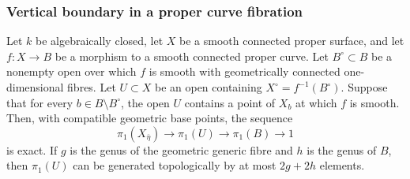 \subsubsection{Vertical boundary in a proper curve fibration}

\begin{proposition}
\label{D:vertical-fibration-exact}
Let $k$ be algebraically closed, let $X$ be a smooth connected
proper surface, and let $f:X\to B$ be a morphism to a smooth
connected proper curve.  Let $B^\circ\subset B$ be a nonempty
open over which $f$ is smooth with geometrically connected
one-dimensional fibres.  Let $U\subset X$ be an open containing
$X^\circ=f^{-1}(B^\circ)$.  Suppose that for every
$b\in B\setminus B^\circ$, the open $U$ contains a point of
$X_b$ at which $f$ is smooth.  Then, with compatible geometric
base points, the sequence
\[
 \pi_1(X_{\overline\eta})\longrightarrow\pi_1(U)
       \longrightarrow\pi_1(B)\longrightarrow1
\]
is exact.  If $g$ is the genus of the geometric generic fibre
and $h$ is the genus of $B$, then $\pi_1(U)$ can be generated
topologically by at most $2g+2h$ elements.
\end{proposition}
